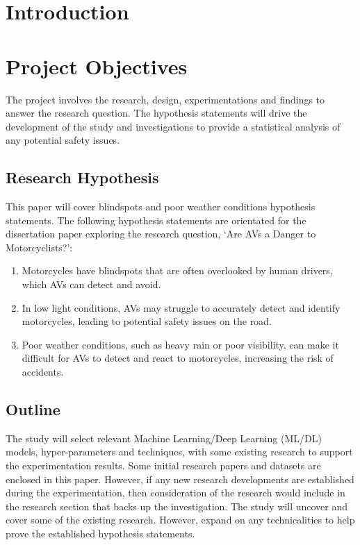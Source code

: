 \documentclass[12pt]{report} %
\begin{document}
\chapter{Introduction}

\chapter{Project Objectives}
\label{chap:projectObjectives}
	
	The project involves the research, design, experimentations and findings to answer the research question. The hypothesis statements will drive the development of the study and investigations to provide a statistical analysis of any potential safety issues.

	\section{Research Hypothesis}
		This paper will cover blindspots and poor weather conditions hypothesis statements. The following hypothesis statements are orientated for the dissertation paper exploring the research question, `Are AVs a Danger to Motorcyclists?':

		\begin{enumerate}
			\item Motorcycles have blindspots that are often overlooked by human drivers, which AVs can detect and avoid.
			\item In low light conditions, AVs may struggle to accurately detect and identify motorcycles, leading to potential safety issues on the road.
			\item Poor weather conditions, such as heavy rain or poor visibility, can make it difficult for AVs to detect and react to motorcycles, increasing the risk of accidents.
		\end{enumerate}

	\section{Outline}
        The study will select relevant Machine Learning/Deep Learning (ML/DL) models, hyper-parameters and techniques, with some existing research to support the experimentation results. Some initial research papers and datasets are enclosed in this paper. However, if any new research developments are established during the experimentation, then consideration of the research would include in the research section that backs up the investigation. The study will uncover and cover some of the existing research. However, expand on any technicalities to help prove the established hypothesis statements.
\end{document}
